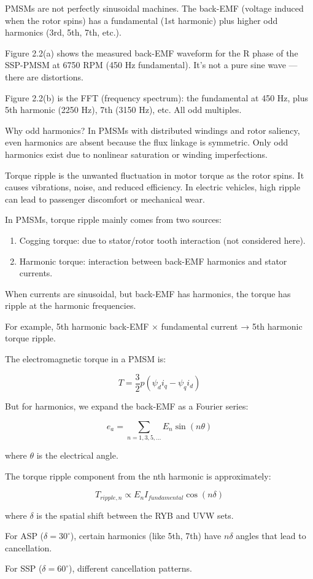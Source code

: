 \documentclass[12pt, a4paper]{article}
\begin{document}
\begin{circuitbox}
PMSMs are not perfectly sinusoidal machines. The back-EMF (voltage induced when the rotor spins) has a fundamental (1st harmonic) plus higher odd harmonics (3rd, 5th, 7th, etc.).

Figure 2.2(a) shows the measured back-EMF waveform for the R phase of the SSP-PMSM at 6750 RPM (450 Hz fundamental). It's not a pure sine wave — there are distortions.

Figure 2.2(b) is the FFT (frequency spectrum): the fundamental at 450 Hz, plus 5th harmonic (2250 Hz), 7th (3150 Hz), etc. All odd multiples.

Why odd harmonics? In PMSMs with distributed windings and rotor saliency, even harmonics are absent because the flux linkage is symmetric. Only odd harmonics exist due to nonlinear saturation or winding imperfections.
\end{circuitbox}

\begin{physbox}
Torque ripple is the unwanted fluctuation in motor torque as the rotor spins. It causes vibrations, noise, and reduced efficiency. In electric vehicles, high ripple can lead to passenger discomfort or mechanical wear.

In PMSMs, torque ripple mainly comes from two sources:
\begin{enumerate}
    \item Cogging torque: due to stator/rotor tooth interaction (not considered here).
    \item Harmonic torque: interaction between back-EMF harmonics and stator currents.
\end{enumerate}

When currents are sinusoidal, but back-EMF has harmonics, the torque has ripple at the harmonic frequencies.

For example, 5th harmonic back-EMF × fundamental current → 5th harmonic torque ripple.
\end{physbox}

\begin{eqnbox}
The electromagnetic torque in a PMSM is:

\[ T = \frac{3}{2} p (\psi_d i_q - \psi_q i_d) \]

But for harmonics, we expand the back-EMF as a Fourier series:

\[ e_a = \sum_{n=1,3,5,\dots} E_n \sin(n \theta) \]

where \(\theta\) is the electrical angle.

The torque ripple component from the nth harmonic is approximately:

\[ T_{ripple,n} \propto E_n I_{fundamental} \cos(n \delta) \]

where \(\delta\) is the spatial shift between the RYB and UVW sets.

For ASP (\(\delta = 30^\circ\)), certain harmonics (like 5th, 7th) have \(n \delta\) angles that lead to cancellation.

For SSP (\(\delta = 60^\circ\)), different cancellation patterns.
\end{eqnbox}
\end{document}
